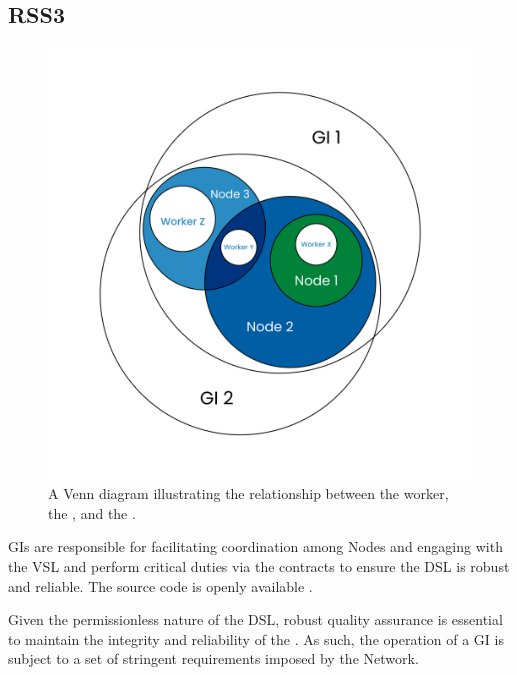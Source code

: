 \subsection{RSS3 }
\label{subsec:GI}

{
    \begin{figure}[tb!]
        \centering
        \includegraphics[width=0.8\columnwidth]{figures/GI.png}
        \caption{A Venn diagram illustrating the relationship between the worker, the , and the .}
        \label{fig:GI}
    \end{figure}
}

\glspl{GI} are responsible for facilitating coordination among \glspl{Node} and engaging with the \gls{VSL} and perform critical duties via the contracts \cite{settlementcontract,stakingcontract,networkparamscontract} to ensure the \gls{DSL} is robust and reliable.
The source code is openly available \cite{rss3globalindexer}.

Given the permissionless nature of the \gls{DSL}, robust quality assurance is essential to maintain the integrity and reliability of the .
As such, the operation of a \gls{GI} is subject to a set of stringent requirements imposed by the Network.

